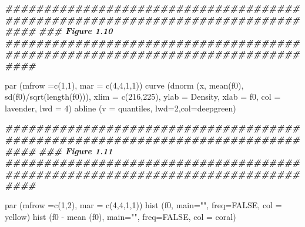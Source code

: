 \documentclass[
]{book}
\newenvironment{Shaded}{\begin{snugshade}}{\end{snugshade}}
\newcommand{\AttributeTok}[1]{\textcolor[rgb]{0.77,0.63,0.00}{#1}}
\newcommand{\ConstantTok}[1]{\textcolor[rgb]{0.00,0.00,0.00}{#1}}
\newcommand{\DecValTok}[1]{\textcolor[rgb]{0.00,0.00,0.81}{#1}}
\newcommand{\DocumentationTok}[1]{\textcolor[rgb]{0.56,0.35,0.01}{\textbf{\textit{#1}}}}
\newcommand{\FunctionTok}[1]{\textcolor[rgb]{0.00,0.00,0.00}{#1}}
\newcommand{\NormalTok}[1]{#1}
\newcommand{\SpecialCharTok}[1]{\textcolor[rgb]{0.00,0.00,0.00}{#1}}
\newcommand{\StringTok}[1]{\textcolor[rgb]{0.31,0.60,0.02}{#1}}
\begin{document}
\begin{Shaded}
\begin{Highlighting}[]
\DocumentationTok{\#\#\#\#\#\#\#\#\#\#\#\#\#\#\#\#\#\#\#\#\#\#\#\#\#\#\#\#\#\#\#\#\#\#\#\#\#\#\#\#\#\#\#\#\#\#\#\#\#\#\#\#\#\#\#\#\#\#\#\#\#\#\#\#\#\#\#\#\#\#\#\#\#\#\#\#\#\#\#\#}
\DocumentationTok{\#\#\# Figure 1.10}
\DocumentationTok{\#\#\#\#\#\#\#\#\#\#\#\#\#\#\#\#\#\#\#\#\#\#\#\#\#\#\#\#\#\#\#\#\#\#\#\#\#\#\#\#\#\#\#\#\#\#\#\#\#\#\#\#\#\#\#\#\#\#\#\#\#\#\#\#\#\#\#\#\#\#\#\#\#\#\#\#\#\#\#\#}

\FunctionTok{par}\NormalTok{ (}\AttributeTok{mfrow =}\FunctionTok{c}\NormalTok{(}\DecValTok{1}\NormalTok{,}\DecValTok{1}\NormalTok{), }\AttributeTok{mar =} \FunctionTok{c}\NormalTok{(}\DecValTok{4}\NormalTok{,}\DecValTok{4}\NormalTok{,}\DecValTok{1}\NormalTok{,}\DecValTok{1}\NormalTok{))}
\FunctionTok{curve}\NormalTok{ (}\FunctionTok{dnorm}\NormalTok{ (x, }\FunctionTok{mean}\NormalTok{(f0), }\FunctionTok{sd}\NormalTok{(f0)}\SpecialCharTok{/}\FunctionTok{sqrt}\NormalTok{(}\FunctionTok{length}\NormalTok{(f0))), }\AttributeTok{xlim =} \FunctionTok{c}\NormalTok{(}\DecValTok{216}\NormalTok{,}\DecValTok{225}\NormalTok{),}
       \AttributeTok{ylab =} \StringTok{\textquotesingle{}Density\textquotesingle{}}\NormalTok{, }\AttributeTok{xlab =} \StringTok{\textquotesingle{}f0\textquotesingle{}}\NormalTok{, }\AttributeTok{col =}\NormalTok{ lavender, }\AttributeTok{lwd =} \DecValTok{4}\NormalTok{)}
\FunctionTok{abline}\NormalTok{ (}\AttributeTok{v =}\NormalTok{ quantiles, }\AttributeTok{lwd=}\DecValTok{2}\NormalTok{,}\AttributeTok{col=}\NormalTok{deepgreen)}

\DocumentationTok{\#\#\#\#\#\#\#\#\#\#\#\#\#\#\#\#\#\#\#\#\#\#\#\#\#\#\#\#\#\#\#\#\#\#\#\#\#\#\#\#\#\#\#\#\#\#\#\#\#\#\#\#\#\#\#\#\#\#\#\#\#\#\#\#\#\#\#\#\#\#\#\#\#\#\#\#\#\#\#\#}
\DocumentationTok{\#\#\# Figure 1.11}
\DocumentationTok{\#\#\#\#\#\#\#\#\#\#\#\#\#\#\#\#\#\#\#\#\#\#\#\#\#\#\#\#\#\#\#\#\#\#\#\#\#\#\#\#\#\#\#\#\#\#\#\#\#\#\#\#\#\#\#\#\#\#\#\#\#\#\#\#\#\#\#\#\#\#\#\#\#\#\#\#\#\#\#\#}

\FunctionTok{par}\NormalTok{ (}\AttributeTok{mfrow =}\FunctionTok{c}\NormalTok{(}\DecValTok{1}\NormalTok{,}\DecValTok{2}\NormalTok{), }\AttributeTok{mar =} \FunctionTok{c}\NormalTok{(}\DecValTok{4}\NormalTok{,}\DecValTok{4}\NormalTok{,}\DecValTok{1}\NormalTok{,}\DecValTok{1}\NormalTok{))}
\FunctionTok{hist}\NormalTok{ (f0, }\AttributeTok{main=}\StringTok{""}\NormalTok{, }\AttributeTok{freq=}\ConstantTok{FALSE}\NormalTok{, }\AttributeTok{col =}\NormalTok{ yellow)}
\FunctionTok{hist}\NormalTok{ (f0 }\SpecialCharTok{{-}} \FunctionTok{mean}\NormalTok{ (f0), }\AttributeTok{main=}\StringTok{""}\NormalTok{, }\AttributeTok{freq=}\ConstantTok{FALSE}\NormalTok{, }\AttributeTok{col =}\NormalTok{ coral)}


\end{Highlighting}
\end{Shaded}
\end{document}
